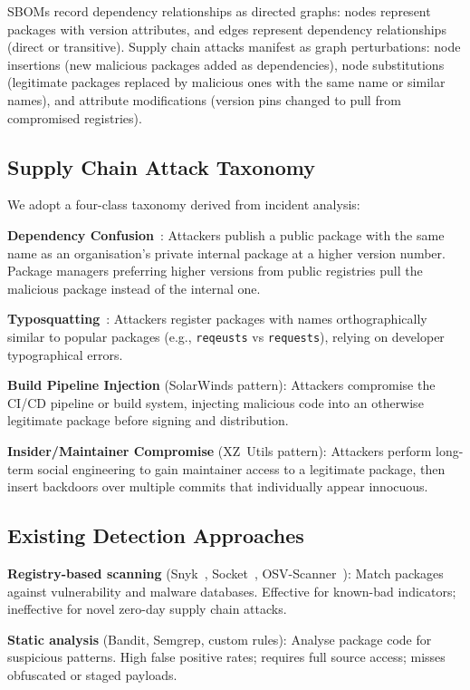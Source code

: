 \documentclass[sigconf,nonacm]{acmart}
\begin{document}
SBOMs record dependency relationships as directed graphs: nodes represent packages
with version attributes, and edges represent dependency relationships (direct or
transitive). Supply chain attacks manifest as graph perturbations: node insertions
(new malicious packages added as dependencies), node substitutions (legitimate
packages replaced by malicious ones with the same name or similar names), and
attribute modifications (version pins changed to pull from compromised registries).

\subsection{Supply Chain Attack Taxonomy}

We adopt a four-class taxonomy derived from incident analysis:

\textbf{Dependency Confusion}~\cite{birsan2021confusion}: Attackers publish a
public package with the same name as an organisation's private internal package at a
higher version number. Package managers preferring higher versions from public
registries pull the malicious package instead of the internal one.

\textbf{Typosquatting}~\cite{neupane2023typo}: Attackers register packages with
names orthographically similar to popular packages (e.g., \texttt{reqeusts} vs
\texttt{requests}), relying on developer typographical errors.

\textbf{Build Pipeline Injection} (SolarWinds pattern): Attackers compromise the
CI/CD pipeline or build system, injecting malicious code into an otherwise
legitimate package before signing and distribution.

\textbf{Insider/Maintainer Compromise} (XZ~Utils pattern): Attackers perform long-term
social engineering to gain maintainer access to a legitimate package, then insert
backdoors over multiple commits that individually appear innocuous.

\subsection{Existing Detection Approaches}

\textbf{Registry-based scanning} (Snyk~\cite{snyk}, Socket~\cite{socket},
OSV-Scanner~\cite{osv}): Match packages against vulnerability and malware databases.
Effective for known-bad indicators; ineffective for novel zero-day supply chain
attacks.

\textbf{Static analysis} (Bandit, Semgrep, custom rules): Analyse package code for
suspicious patterns. High false positive rates; requires full source access;
misses obfuscated or staged payloads.
\end{document}
